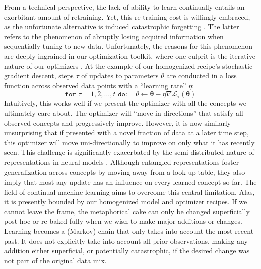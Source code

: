 \documentclass[manuscript,screen,authorversion,nonacm]{acmart}
\begin{document}
From a technical perspective, the lack of ability to learn continually entails an exorbitant amount of retraining. Yet, this re-training cost is willingly embraced, as the unfortunate alternative is induced catastrophic forgetting \cite{McCloskey1989Catastrophic,Ratcliff1990}. The latter refers to the phenomenon of abruptly losing acquired information when sequentially tuning to new data. Unfortunately, the reasons for this phenomenon are deeply ingrained in our optimization toolkit, where one culprit is the iterative nature of our optimizers \cite{Tsypkin1966Training}. At the example of our homogenized recipe's stochastic gradient descent, steps $\tau$ of updates to parameters $\theta$ are conducted in a loss function across observed data points with a ``learning rate'' $\eta$: 
\begin{equation}
    \mathtt{for} \, \, \tau = 1,2, \ldots, t \, \, \mathtt{do:} \quad
     \mathcal{\theta} \leftarrow \mathbf{\theta} - \eta \nabla \mathcal{L}_{\tau}(\mathbf{\theta})
\end{equation}
Intuitively, this works well if we present the optimizer with all the concepts we ultimately care about. The optimizer will ``move in directions'' that satisfy all observed concepts and progressively improve. However, it is now similarly unsurprising that if presented with a novel fraction of data at a later time step, this optimizer will move uni-directionally to improve on only what it has recently seen. This challenge is significantly exacerbated by the semi-distributed nature of representations in neural models \cite{French1992SemiDistributedForgetting}. Although entangled representations foster generalization across concepts by moving away from a look-up table, they also imply that most any update has an influence on every learned concept so far.  
The field of continual machine learning \cite{Hadsell2020EmbracingChange,Mundt2023WholisticCL} aims to overcome this central limitation. Alas, it is presently bounded by our homogenized model and optimizer recipes. If we cannot leave the frame, the metaphorical cake can only be changed superficially post-hoc or re-baked fully when we wish to make major additions or changes. Learning becomes a (Markov) chain that only takes into account the most recent past. It does not explicitly take into account all prior observations, making any addition either superficial, or potentially catastrophic, if the desired change was not part of the original data mix. \\
\end{document}
